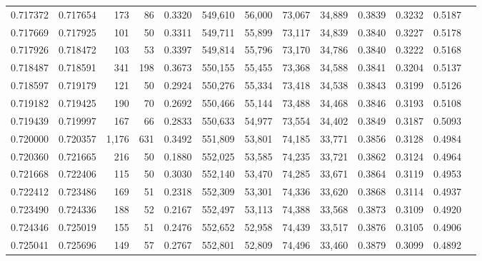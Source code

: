 \begin{tabular}{rrrrrrrrrrrrr}
0.717372 & 0.717654 &   173 &  86 &                                     0.3320 & 549,610 &  56,000 &  73,067 &  34,889 & 0.3839 & 0.3232 & 0.5187 \\
0.717669 & 0.717925 &   101 &  50 &                                     0.3311 & 549,711 &  55,899 &  73,117 &  34,839 & 0.3840 & 0.3227 & 0.5178 \\
0.717926 & 0.718472 &   103 &  53 &                                     0.3397 & 549,814 &  55,796 &  73,170 &  34,786 & 0.3840 & 0.3222 & 0.5168 \\
0.718487 & 0.718591 &   341 & 198 &                                     0.3673 & 550,155 &  55,455 &  73,368 &  34,588 & 0.3841 & 0.3204 & 0.5137 \\
0.718597 & 0.719179 &   121 &  50 &                                     0.2924 & 550,276 &  55,334 &  73,418 &  34,538 & 0.3843 & 0.3199 & 0.5126 \\
0.719182 & 0.719425 &   190 &  70 &                                     0.2692 & 550,466 &  55,144 &  73,488 &  34,468 & 0.3846 & 0.3193 & 0.5108 \\
0.719439 & 0.719997 &   167 &  66 &                                     0.2833 & 550,633 &  54,977 &  73,554 &  34,402 & 0.3849 & 0.3187 & 0.5093 \\
0.720000 & 0.720357 & 1,176 & 631 &                                     0.3492 & 551,809 &  53,801 &  74,185 &  33,771 & 0.3856 & 0.3128 & 0.4984 \\
0.720360 & 0.721665 &   216 &  50 &                                     0.1880 & 552,025 &  53,585 &  74,235 &  33,721 & 0.3862 & 0.3124 & 0.4964 \\
0.721668 & 0.722406 &   115 &  50 &                                     0.3030 & 552,140 &  53,470 &  74,285 &  33,671 & 0.3864 & 0.3119 & 0.4953 \\
0.722412 & 0.723486 &   169 &  51 &                                     0.2318 & 552,309 &  53,301 &  74,336 &  33,620 & 0.3868 & 0.3114 & 0.4937 \\
0.723490 & 0.724336 &   188 &  52 &                                     0.2167 & 552,497 &  53,113 &  74,388 &  33,568 & 0.3873 & 0.3109 & 0.4920 \\
0.724346 & 0.725019 &   155 &  51 &                                     0.2476 & 552,652 &  52,958 &  74,439 &  33,517 & 0.3876 & 0.3105 & 0.4906 \\
0.725041 & 0.725696 &   149 &  57 &                                     0.2767 & 552,801 &  52,809 &  74,496 &  33,460 & 0.3879 & 0.3099 & 0.4892 \\

\end{tabular}
